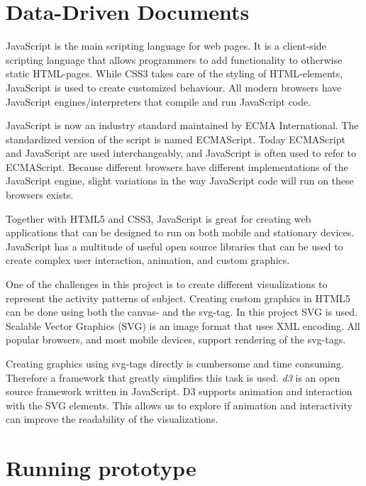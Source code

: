 \section{Data-Driven Documents}
JavaScript is the main scripting language for web pages. It is a client-side scripting language that allows programmers to add functionality to otherwise static HTML-pages. While CSS3 takes care of the styling of HTML-elements, JavaScript is used to create customized behaviour. All modern browsers have JavaScript engines/interpreters that compile and run JavaScript code.

JavaScript is now an industry standard maintained by ECMA International. The standardized version of the script is named ECMAScript. Today ECMAScript and JavaScript are used interchangeably, and JavaScript is often used to refer to ECMAScript. Because different browsers have different implementations of the JavaScript engine, slight variations in the way JavaScript code will run on these browsers exists.

Together with HTML5 and CSS3, JavaScript is great for creating web applications that can be designed to run on both mobile and stationary devices. JavaScript has a multitude of useful open source libraries that can be used to create complex user interaction, animation, and custom graphics.

One of the challenges in this project is to create different visualizations to represent the activity patterns of subject. Creating custom graphics in HTML5 can be done using both the canvas- and the svg-tag. In this project SVG is used. Scalable Vector Graphics (SVG) is an image format that uses XML encoding. All popular browsers, and most mobile devices, support rendering of the svg-tags.

Creating graphics using svg-tags directly is cumbersome and time consuming. Therefore a framework that greatly simplifies this task is used. \emph{\gls{d3}} is an open source framework written in JavaScript. D3 supports animation and interaction with the SVG elements. This allows us to explore if animation and interactivity can improve the readability of the visualizations.

\section{Running prototype}

